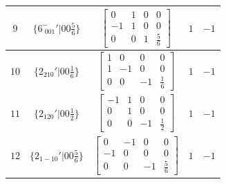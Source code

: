 \documentclass[fleqn,8pt]{jsarticle}
\begin{document}
\begin{longtable}{ccccc}
$ 9 $ & $ \{6^{-}_{\,\,001}{}'|0 0 \frac{5}{6}\} $ & $ \begin{bmatrix} 0 & 1 & 0 & 0 \\ -1 & 1 & 0 & 0 \\ 0 & 0 & 1 & \frac{5}{6} \end{bmatrix} $ & $ 1 $ & $ -1 $ \\ \hline
$ 10 $ & $ \{2{}_{210}{}'|0 0 \frac{1}{6}\} $ & $ \begin{bmatrix} 1 & 0 & 0 & 0 \\ 1 & -1 & 0 & 0 \\ 0 & 0 & -1 & \frac{1}{6} \end{bmatrix} $ & $ 1 $ & $ -1 $ \\ \hline
$ 11 $ & $ \{2{}_{120}{}'|0 0 \frac{1}{2}\} $ & $ \begin{bmatrix} -1 & 1 & 0 & 0 \\ 0 & 1 & 0 & 0 \\ 0 & 0 & -1 & \frac{1}{2} \end{bmatrix} $ & $ 1 $ & $ -1 $ \\ \hline
$ 12 $ & $ \{2{}_{1-10}{}'|0 0 \frac{5}{6}\} $ & $ \begin{bmatrix} 0 & -1 & 0 & 0 \\ -1 & 0 & 0 & 0 \\ 0 & 0 & -1 & \frac{5}{6} \end{bmatrix} $ & $ 1 $ & $ -1 $ \\
\end{longtable}
\end{document}
